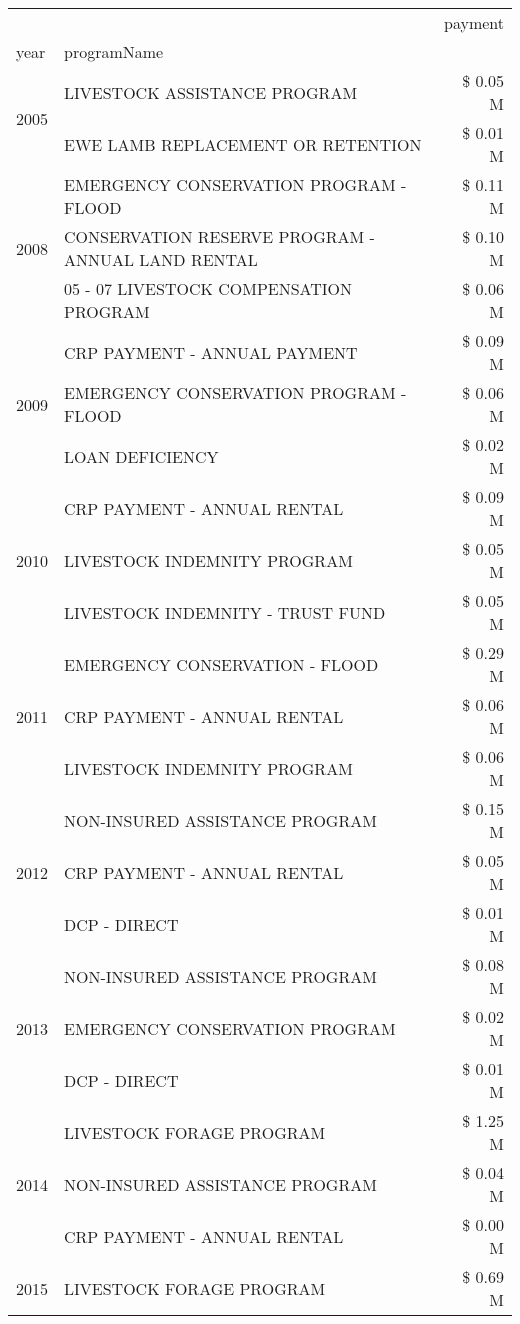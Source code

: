 \begin{tabular}{llr}
\toprule
 &  & payment \\
year & programName &  \\
\midrule
\multirow[t]{2}{*}{2005} & LIVESTOCK ASSISTANCE PROGRAM & \$ 0.05 M \\
 & EWE LAMB REPLACEMENT OR RETENTION & \$ 0.01 M \\
\cline{1-3}
\multirow[t]{3}{*}{2008} & EMERGENCY CONSERVATION PROGRAM - FLOOD & \$ 0.11 M \\
 & CONSERVATION RESERVE PROGRAM - ANNUAL LAND RENTAL & \$ 0.10 M \\
 & 05 - 07 LIVESTOCK COMPENSATION PROGRAM & \$ 0.06 M \\
\cline{1-3}
\multirow[t]{3}{*}{2009} & CRP PAYMENT - ANNUAL PAYMENT & \$ 0.09 M \\
 & EMERGENCY CONSERVATION PROGRAM - FLOOD & \$ 0.06 M \\
 & LOAN DEFICIENCY & \$ 0.02 M \\
\cline{1-3}
\multirow[t]{3}{*}{2010} & CRP PAYMENT - ANNUAL RENTAL & \$ 0.09 M \\
 & LIVESTOCK INDEMNITY PROGRAM & \$ 0.05 M \\
 & LIVESTOCK INDEMNITY - TRUST FUND & \$ 0.05 M \\
\cline{1-3}
\multirow[t]{3}{*}{2011} & EMERGENCY CONSERVATION - FLOOD & \$ 0.29 M \\
 & CRP PAYMENT - ANNUAL RENTAL & \$ 0.06 M \\
 & LIVESTOCK INDEMNITY PROGRAM & \$ 0.06 M \\
\cline{1-3}
\multirow[t]{3}{*}{2012} & NON-INSURED ASSISTANCE PROGRAM & \$ 0.15 M \\
 & CRP PAYMENT - ANNUAL RENTAL & \$ 0.05 M \\
 & DCP - DIRECT & \$ 0.01 M \\
\cline{1-3}
\multirow[t]{3}{*}{2013} & NON-INSURED ASSISTANCE PROGRAM & \$ 0.08 M \\
 & EMERGENCY CONSERVATION PROGRAM & \$ 0.02 M \\
 & DCP - DIRECT & \$ 0.01 M \\
\cline{1-3}
\multirow[t]{3}{*}{2014} & LIVESTOCK FORAGE PROGRAM & \$ 1.25 M \\
 & NON-INSURED ASSISTANCE PROGRAM & \$ 0.04 M \\
 & CRP PAYMENT - ANNUAL RENTAL & \$ 0.00 M \\
\cline{1-3}
\multirow[t]{3}{*}{2015} & LIVESTOCK FORAGE PROGRAM & \$ 0.69 M \\

\end{tabular}
